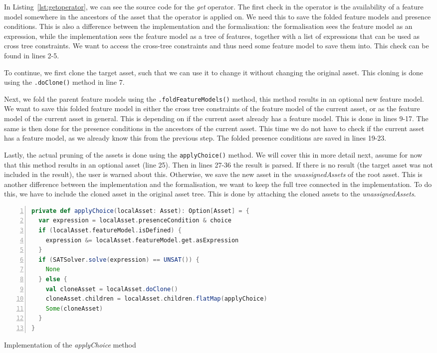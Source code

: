 In Listing~\ref{lst:getoperator}, we can see the source code for the \emph{get} operator.
The first check in the operator is the availability of a feature model somewhere in the
ancestors of the asset that the operator is applied on. We need this to save the folded
feature models and presence conditions. This is also a difference between the implementation
and the formalisation: the formalisation sees the feature model as an expression, while the
implementation sees the feature model as a tree of features, together with a list of
expressions that can be used as cross tree constraints. We want to access the cross-tree
constraints and thus need some feature model to save them into. This check can be found in
lines 2-5. 

To continue, we first clone the target asset, such that we can use it to change it without
changing the original asset. This cloning is done using the \texttt{.doClone()} method in
line 7.

Next, we fold the parent feature models using the \texttt{.foldFeatureModels()} method, this
method results in an optional new feature model. We want to save this folded feature model
in either the cross tree constraints of the feature model of the current asset, or as the
feature model of the current asset in general. This is depending on if the current asset
already has a feature model. This is done in lines 9-17. The same is then done for the 
presence conditions in the ancestors of the current asset. This time we do not have to
check if the current asset has a feature model, as we already know this from the previous
step. The folded presence conditions are saved in lines 19-23.

Lastly, the actual pruning of the assets is done using the \texttt{applyChoice()} method.
We will cover this in more detail next, assume for now that this method results in an 
optional asset (line 25). Then in lines 27-36 the result is parsed. If there is no result
(the target asset was not included in the result), the user is warned about this. Otherwise,
we save the new asset in the \emph{unassignedAssets} of the root asset. This is another
difference between the implementation and the formalisation, we want to keep the full
tree connected in the implementation. To do this, we have to include the cloned asset in
the original asset tree. This is done by attaching the cloned assets to the \emph{unassignedAssets}.

\begin{lstfloat}
\begin{lstlisting}[language=Scala,numbers=left,showstringspaces=false]
private def applyChoice(localAsset: Asset): Option[Asset] = {
  var expression = localAsset.presenceCondition & choice
  if (localAsset.featureModel.isDefined) {
    expression &= localAsset.featureModel.get.asExpression
  }
  if (SATSolver.solve(expression) == UNSAT()) {
    None
  } else {
    val cloneAsset = localAsset.doClone()
    cloneAsset.children = localAsset.children.flatMap(applyChoice)
    Some(cloneAsset)
  }
}
\end{lstlisting}
\caption{Implementation of the \emph{applyChoice} method}
\label{lst:getoperator:applychoice}
\end{lstfloat}

